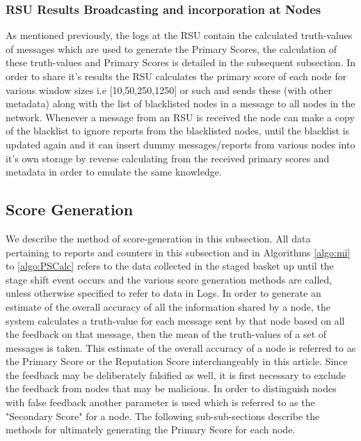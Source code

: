 \documentclass[journal]{IEEEtran}
\begin{document}
\subsubsection{RSU Results Broadcasting and incorporation at Nodes}
As mentioned previously, the logs at the RSU contain the calculated truth-values of messages which are used to generate the Primary Scores, the calculation of these truth-values and Primary Scores is detailed in the subsequent subsection.
In order to share it's results the RSU calculates the primary score of each node for various window sizes i.e [10,50,250,1250] or such and sends these (with other metadata) along with the list of blacklisted nodes in a message to all nodes in the network. Whenever a message from an RSU is received the node can make a copy of the blacklist to ignore reports from the blacklisted nodes, until the blacklist is updated again and it can insert dummy messages/reports from various nodes into it's own storage by reverse calculating from the received primary scores and metadata in order to emulate the same knowledge.
\subsection{Score Generation}
\label{sec:PM:ScoreGeneretion}
We describe the method of score-generation in this subsection. All data pertaining to reports and counters in this subsection and in Algorithms \ref{algo:mi} to \ref{algo:PSCalc} refers to the data collected in the staged basket up until the stage shift event occurs and the various score generation methods are called, unless otherwise specified to refer to data in Logs. 
In order to generate an estimate of the overall accuracy of all the information shared by a node, the system calculates a truth-value for each message sent by that node based on all the feedback on that message, then the mean of the truth-values of a set of messages is taken. This estimate of the overall accuracy of a node is referred to as the Primary Score or the Reputation Score interchangeably in this article. Since the feedback may be deliberately falsified as well, it is first necessary to exclude the feedback from nodes that may be malicious. In order to distinguish nodes with false feedback another parameter is used which is referred to as the "Secondary Score" for a node.
The following sub-sub-sections describe the methods for ultimately generating the Primary Score for each node.
\end{document}
